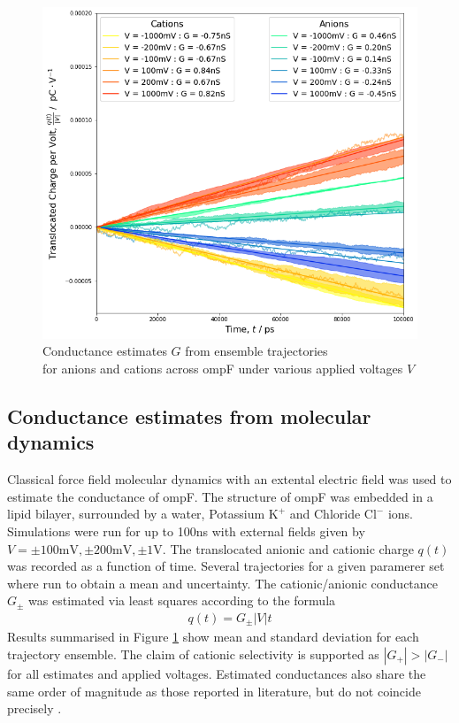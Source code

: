 \documentclass{article}[12pt]
\numberwithin{equation}{section}
\begin{document}
\begin{figure}[H]
	\centering{}
	\captionsetup{justification=centering}
	\includegraphics[scale=0.47]{conductance}
\caption{Conductance estimates $G$ from ensemble trajectories \\
for anions and cations across ompF under various applied voltages $V$ }
\label{fig:conductance}
\end{figure}

\subsection{Conductance estimates from molecular dynamics}
Classical force field molecular dynamics with an extental electric field was
used to estimate the conductance of ompF. The structure of ompF was embedded
in a lipid bilayer, surrounded by a water, Potassium $\mathrm{K^{+}}$ and
Chloride $\mathrm{Cl^{-}}$ ions. Simulations were run for up to 100ns with
external fields given by $V=\pm100\mathrm{mV},\pm200\mathrm{mV},\pm1\mathrm{V}$.
The translocated anionic and cationic charge $q(t)$ was recorded as a function of time.
Several trajectories for a given paramerer set where run to obtain a mean and
uncertainty. The cationic/anionic conductance $G_{\pm}$ was estimated via least squares according to
the formula
\begin{align}
	q(t)=G_{\pm}|V|t
\end{align}
Results summarised in Figure \ref{fig:conductance} show mean and standard
deviation for each trajectory ensemble. The claim of cationic selectivity
\cite{Benz1985} is supported as $|G_{+}|>|G_{-}|$ for all estimates and
applied voltages. Estimated conductances also share the same order of
magnitude as those reported in literature, but do not coincide precisely
\cite{Benz1985}.



\end{document}

